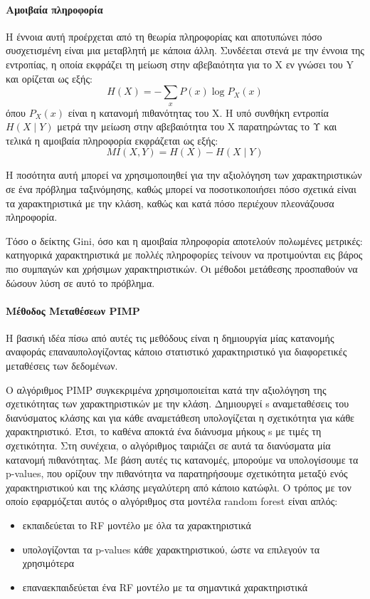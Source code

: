 \documentclass{article}
\begin{document}
\paragraph{Αμοιβαία πληροφορία} H έννοια αυτή προέρχεται από τη θεωρία πληροφορίας και αποτυπώνει πόσο συσχετισμένη είναι μια μεταβλητή με κάποια άλλη. Συνδέεται στενά με την έννοια της εντροπίας, η οποία εκφράζει τη μείωση στην αβεβαιότητα για το Χ εν γνώσει του Y και ορίζεται ως εξής:
$$H(X)= - \sum_{x} P(x) \log{P_X(x)}$$
όπου $ P_X(x)$ είναι η κατανομή πιθανότητας του X. Η υπό συνθήκη εντροπία $H(X \mid Y)$ μετρά την μείωση στην αβεβαιότητα του Χ παρατηρώντας το Υ και τελικά η αμοιβαία πληροφορία εκφράζεται ως εξής:
$$MI(X, Y)= H(X) - H(X \mid Y)$$

Η ποσότητα αυτή μπορεί να χρησιμοποιηθεί για την αξιολόγηση των χαρακτηριστικών σε ένα πρόβλημα ταξινόμησης, καθώς μπορεί να ποσοτικοποιήσει πόσο σχετικά είναι τα χαρακτηριστικά με την κλάση, καθώς και κατά πόσο περιέχουν πλεονάζουσα πληροφορία.

Τόσο ο δείκτης Gini, όσο και η αμοιβαία πληροφορία αποτελούν πολωμένες μετρικές: κατηγορικά χαρακτηριστικά με πολλές πληροφορίες τείνουν να προτιμούνται εις βάρος πιο συμπαγών και χρήσιμων χαρακτηριστικών. Οι μέθοδοι μετάθεσης προσπαθούν να δώσουν λύση σε αυτό το πρόβλημα.
\paragraph{Μέθοδος Μεταθέσεων PIMP} Η βασική ιδέα πίσω από αυτές τις μεθόδους είναι η δημιουργία μίας κατανομής αναφοράς επαναυπολογίζοντας κάποιο στατιστικό χαρακτηριστικό για διαφορετικές μεταθέσεις των δεδομένων.

Ο αλγόριθμος PIMP συγκεκριμένα χρησιμοποιείται κατά την αξιολόγηση της σχετικότητας των χαρακτηριστικών με την κλάση. Δημιουργεί s αναμεταθέσεις του διανύσματος κλάσης και για κάθε αναμετάθεση υπολογίζεται η σχετικότητα για κάθε χαρακτηριστικό. Έτσι, το καθένα αποκτά ένα διάνυσμα μήκους s με τιμές τη σχετικότητα. Στη συνέχεια, ο αλγόριθμος ταιριάζει σε αυτά τα διανύσματα μία κατανομή πιθανότητας. Με βάση αυτές τις κατανομές, μπορούμε να υπολογίσουμε τα p-values, που ορίζουν την πιθανότητα να παρατηρήσουμε σχετικότητα μεταξύ ενός χαρακτηριστικού και της κλάσης μεγαλύτερη από κάποιο κατώφλι. Ο τρόπος με τον οποίο
εφαρμόζεται αυτός ο αλγόριθμος στα μοντέλα random forest είναι απλός:
\begin{itemize}
\item εκπαιδεύεται το RF μοντέλο με όλα τα χαρακτηριστικά
\item υπολογίζονται τα p-values κάθε χαρακτηριστικού, ώστε να επιλεγούν τα χρησιμότερα
\item επαναεκπαιδεύεται ένα RF μοντέλο με τα σημαντικά χαρακτηριστικά
\end{itemize}
\end{document}
